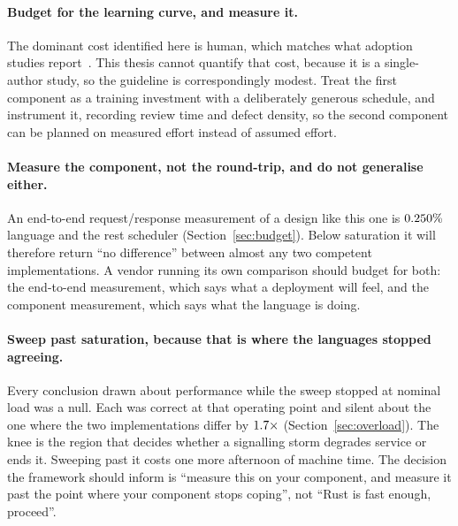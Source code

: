 \documentclass[english,oneside,a4paper,censored,csm,software-track-2020]{HYthesisML}
\begin{document}
\begin{appendices}
\paragraph{Budget for the learning curve, and measure it.}
The dominant cost identified here is human, which matches what adoption studies
report~\cite{fulton2021adopting}. This thesis cannot quantify that cost, because it is a
single-author study, so the guideline is correspondingly modest. Treat the first component as a
training investment with a deliberately generous schedule, and instrument it, recording review
time and defect density, so the second component can be planned on measured effort instead of
assumed effort.

\paragraph{Measure the component, not the round-trip, and do not generalise either.}
An end-to-end request/response measurement of a design like this one is
$0.250\%$ language and the rest scheduler (Section~\ref{sec:budget}). Below
saturation it will therefore return ``no difference'' between almost any two competent
implementations. A vendor running its own comparison should budget for both: the end-to-end
measurement, which says what a deployment will feel, and the component measurement, which says
what the language is doing.

\paragraph{Sweep past saturation, because that is where the languages stopped agreeing.}
Every conclusion drawn about performance while the sweep stopped at nominal load was a null.
Each was correct at that operating point and silent about the one where the two implementations
differ by $1.7\times$ (Section~\ref{sec:overload}). The knee is the region that
decides whether a signalling storm degrades service or ends it. Sweeping past it costs one more
afternoon of machine time. The decision the framework should inform is ``measure this on your
component, and measure it past the point where your component stops coping'', not ``Rust is fast
enough, proceed''.

\end{appendices}

\clearpage
\end{document}
